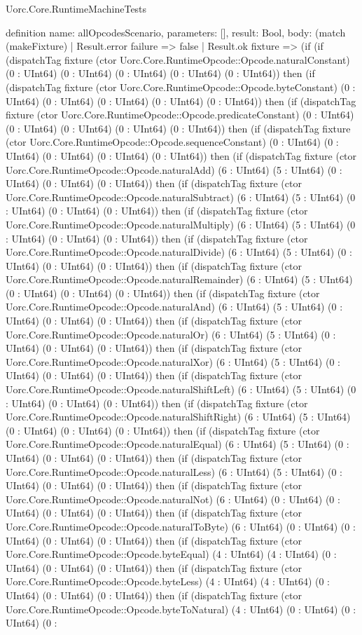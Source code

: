 \begin{lexlean}{Uorc.Core.RuntimeMachineTests}
\begin{semanticmodule}
definition{
  name: allOpcodesScenario,
  parameters: [],
  result: Bool,
  body: (match (makeFixture)
    | Result.error failure => false
    | Result.ok fixture => (if (if (dispatchTag fixture (ctor Uorc.Core.RuntimeOpcode::Opcode.naturalConstant) (0 : UInt64) (0 : UInt64) (0 : UInt64) (0 : UInt64) (0 : UInt64)) then (if (dispatchTag fixture (ctor Uorc.Core.RuntimeOpcode::Opcode.byteConstant) (0 : UInt64) (0 : UInt64) (0 : UInt64) (0 : UInt64) (0 : UInt64)) then (if (dispatchTag fixture (ctor Uorc.Core.RuntimeOpcode::Opcode.predicateConstant) (0 : UInt64) (0 : UInt64) (0 : UInt64) (0 : UInt64) (0 : UInt64)) then (if (dispatchTag fixture (ctor Uorc.Core.RuntimeOpcode::Opcode.sequenceConstant) (0 : UInt64) (0 : UInt64) (0 : UInt64) (0 : UInt64) (0 : UInt64)) then (if (dispatchTag fixture (ctor Uorc.Core.RuntimeOpcode::Opcode.naturalAdd) (6 : UInt64) (5 : UInt64) (0 : UInt64) (0 : UInt64) (0 : UInt64)) then (if (dispatchTag fixture (ctor Uorc.Core.RuntimeOpcode::Opcode.naturalSubtract) (6 : UInt64) (5 : UInt64) (0 : UInt64) (0 : UInt64) (0 : UInt64)) then (if (dispatchTag fixture (ctor Uorc.Core.RuntimeOpcode::Opcode.naturalMultiply) (6 : UInt64) (5 : UInt64) (0 : UInt64) (0 : UInt64) (0 : UInt64)) then (if (dispatchTag fixture (ctor Uorc.Core.RuntimeOpcode::Opcode.naturalDivide) (6 : UInt64) (5 : UInt64) (0 : UInt64) (0 : UInt64) (0 : UInt64)) then (if (dispatchTag fixture (ctor Uorc.Core.RuntimeOpcode::Opcode.naturalRemainder) (6 : UInt64) (5 : UInt64) (0 : UInt64) (0 : UInt64) (0 : UInt64)) then (if (dispatchTag fixture (ctor Uorc.Core.RuntimeOpcode::Opcode.naturalAnd) (6 : UInt64) (5 : UInt64) (0 : UInt64) (0 : UInt64) (0 : UInt64)) then (if (dispatchTag fixture (ctor Uorc.Core.RuntimeOpcode::Opcode.naturalOr) (6 : UInt64) (5 : UInt64) (0 : UInt64) (0 : UInt64) (0 : UInt64)) then (if (dispatchTag fixture (ctor Uorc.Core.RuntimeOpcode::Opcode.naturalXor) (6 : UInt64) (5 : UInt64) (0 : UInt64) (0 : UInt64) (0 : UInt64)) then (if (dispatchTag fixture (ctor Uorc.Core.RuntimeOpcode::Opcode.naturalShiftLeft) (6 : UInt64) (5 : UInt64) (0 : UInt64) (0 : UInt64) (0 : UInt64)) then (if (dispatchTag fixture (ctor Uorc.Core.RuntimeOpcode::Opcode.naturalShiftRight) (6 : UInt64) (5 : UInt64) (0 : UInt64) (0 : UInt64) (0 : UInt64)) then (if (dispatchTag fixture (ctor Uorc.Core.RuntimeOpcode::Opcode.naturalEqual) (6 : UInt64) (5 : UInt64) (0 : UInt64) (0 : UInt64) (0 : UInt64)) then (if (dispatchTag fixture (ctor Uorc.Core.RuntimeOpcode::Opcode.naturalLess) (6 : UInt64) (5 : UInt64) (0 : UInt64) (0 : UInt64) (0 : UInt64)) then (if (dispatchTag fixture (ctor Uorc.Core.RuntimeOpcode::Opcode.naturalNot) (6 : UInt64) (0 : UInt64) (0 : UInt64) (0 : UInt64) (0 : UInt64)) then (if (dispatchTag fixture (ctor Uorc.Core.RuntimeOpcode::Opcode.naturalToByte) (6 : UInt64) (0 : UInt64) (0 : UInt64) (0 : UInt64) (0 : UInt64)) then (if (dispatchTag fixture (ctor Uorc.Core.RuntimeOpcode::Opcode.byteEqual) (4 : UInt64) (4 : UInt64) (0 : UInt64) (0 : UInt64) (0 : UInt64)) then (if (dispatchTag fixture (ctor Uorc.Core.RuntimeOpcode::Opcode.byteLess) (4 : UInt64) (4 : UInt64) (0 : UInt64) (0 : UInt64) (0 : UInt64)) then (if (dispatchTag fixture (ctor Uorc.Core.RuntimeOpcode::Opcode.byteToNatural) (4 : UInt64) (0 : UInt64) (0 : UInt64) (0 : }
\end{semanticmodule}
\end{lexlean}
